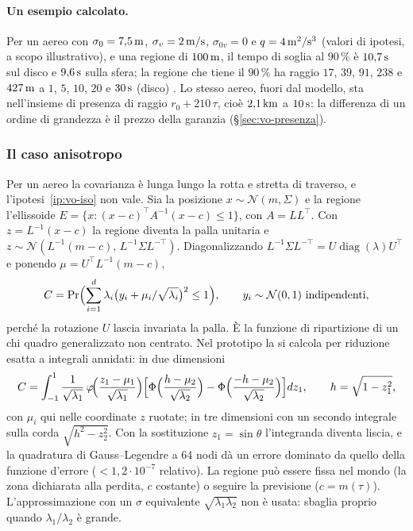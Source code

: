 \paragraph{Un esempio calcolato.} Per un aereo con $\sigma_0=7{,}5\,\mathrm{m}$, $\sigma_v=2\,\mathrm{m/s}$, $\sigma_{0v}=0$ e $q=4\,\mathrm{m^2/s^3}$ (valori di ipotesi, a scopo illustrativo), e una regione di $100\,\mathrm{m}$, il tempo di soglia al $90\,\%$ è $10{,}7\,\mathrm{s}$ sul disco e $9{,}6\,\mathrm{s}$ sulla sfera; la regione che tiene il $90\,\%$ ha raggio $17$, $39$, $91$, $238$ e $427\,\mathrm{m}$ a $1$, $5$, $10$, $20$ e $30\,\mathrm{s}$ (disco) . Lo stesso aereo, fuori dal modello, sta nell'insieme di presenza di raggio $r_0+210\,\tau$, cioè $2{,}1\,\mathrm{km}$ a $10\,\mathrm{s}$: la differenza di un ordine di grandezza è il prezzo della garanzia (\S\ref{sec:vo-presenza}).

\subsubsection{Il caso anisotropo}\label{sec:vo-c-aniso}

Per un aereo la covarianza è lunga lungo la rotta e stretta di traverso, e l'ipotesi~\ref{ip:vo-iso} non vale. Sia la posizione $x\sim\mathcal N(m,\Sigma)$ e la regione l'ellissoide $E=\{x:(x-c)^\top A^{-1}(x-c)\le1\}$, con $A=LL^\top$. Con $z=L^{-1}(x-c)$ la regione diventa la palla unitaria e $z\sim\mathcal N(L^{-1}(m-c),\,L^{-1}\Sigma L^{-\top})$. Diagonalizzando $L^{-1}\Sigma L^{-\top}=U\operatorname{diag}(\lambda)U^\top$ e ponendo $\mu=U^\top L^{-1}(m-c)$,
\begin{equation}\label{eq:vo-aniso}
C=\Pr\Bigl(\sum_{i=1}^d\lambda_i\bigl(y_i+\mu_i/\sqrt{\lambda_i}\bigr)^2\le1\Bigr),\qquad y_i\sim\mathcal N(0,1)\ \text{indipendenti},
\end{equation}
perché la rotazione $U$ lascia invariata la palla. È la funzione di ripartizione di un chi quadro generalizzato non centrato. Nel prototipo la si calcola per riduzione esatta a integrali annidati: in due dimensioni
\[C=\int_{-1}^{1}\frac{1}{\sqrt{\lambda_1}}\,\varphi\!\Bigl(\frac{z_1-\mu_1}{\sqrt{\lambda_1}}\Bigr)\Bigl[\Phi\Bigl(\frac{h-\mu_2}{\sqrt{\lambda_2}}\Bigr)-\Phi\Bigl(\frac{-h-\mu_2}{\sqrt{\lambda_2}}\Bigr)\Bigr]dz_1,\qquad h=\sqrt{1-z_1^2},\]
con $\mu_i$ qui nelle coordinate $z$ ruotate; in tre dimensioni con un secondo integrale sulla corda $\sqrt{h^2-z_2^2}$. Con la sostituzione $z_1=\sin\theta$ l'integranda diventa liscia, e la quadratura di Gauss--Legendre a 64 nodi dà un errore dominato da quello della funzione d'errore ($<1{,}2\cdot10^{-7}$ relativo). La regione può essere fissa nel mondo (la zona dichiarata alla perdita, $c$ costante) o seguire la previsione ($c=m(\tau)$). L'approssimazione con un $\sigma$ equivalente $\sqrt{\lambda_1\lambda_2}$ non è usata: sbaglia proprio quando $\lambda_1/\lambda_2$ è grande.

